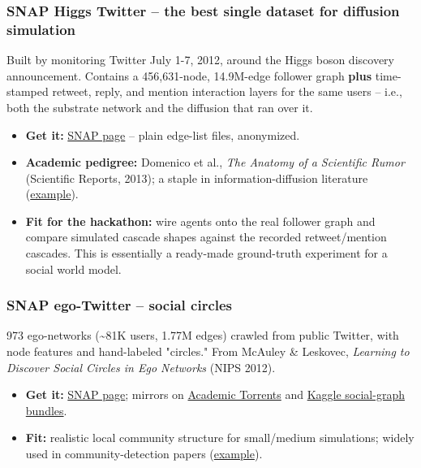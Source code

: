 \documentclass[twocolumn,10pt,letterpaper]{article}
\begin{document}
\subsubsection{SNAP Higgs Twitter -- the best single dataset for diffusion simulation}

Built by monitoring Twitter July 1-7, 2012, around the Higgs boson discovery announcement. Contains a 456,631-node, 14.9M-edge follower graph \textbf{plus} time-stamped retweet, reply, and mention interaction layers for the same users -- i.e., both the substrate network and the diffusion that ran over it.


\begin{itemize}
\setlength{\itemsep}{0pt}
\setlength{\parskip}{0pt}
  \item \textbf{Get it:} \href{https://snap.stanford.edu/data/higgs-twitter.html}{SNAP page} -- plain edge-list files, anonymized.
  \item \textbf{Academic pedigree:} Domenico et al., \textit{The Anatomy of a Scientific Rumor} (Scientific Reports, 2013); a staple in information-diffusion literature (\href{https://arxiv.org/pdf/1508.00540}{example}).
  \item \textbf{Fit for the hackathon:} wire agents onto the real follower graph and compare simulated cascade shapes against the recorded retweet/mention cascades. This is essentially a ready-made ground-truth experiment for a social world model.
\end{itemize}

\subsubsection{SNAP ego-Twitter -- social circles}

973 ego-networks (\textasciitilde{}81K users, 1.77M edges) crawled from public Twitter, with node features and hand-labeled "circles." From McAuley \& Leskovec, \textit{Learning to Discover Social Circles in Ego Networks} (NIPS 2012).


\begin{itemize}
\setlength{\itemsep}{0pt}
\setlength{\parskip}{0pt}
  \item \textbf{Get it:} \href{https://snap.stanford.edu/data/ego-Twitter.html}{SNAP page}; mirrors on \href{https://academictorrents.com/details/276e1028b08decbf711f275a57901dbde88ca5ab}{Academic Torrents} and \href{https://www.kaggle.com/datasets/wolfram77/graphs-social}{Kaggle social-graph bundles}.
  \item \textbf{Fit:} realistic local community structure for small/medium simulations; widely used in community-detection papers (\href{https://arxiv.org/pdf/2012.09561}{example}).
\end{itemize}
\end{document}
